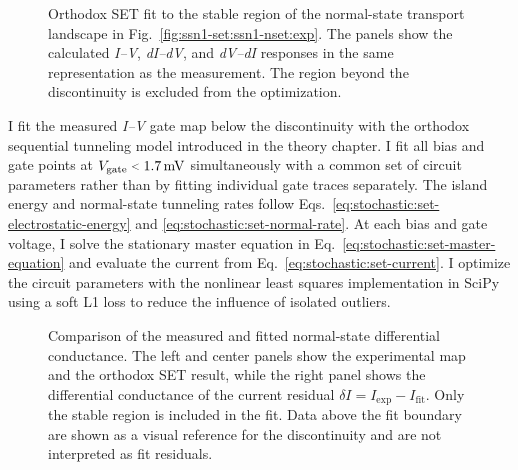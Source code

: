             \begin{figure}[p]
                \centering
                \caption{
                    Measured normal-state gate--bias transport of SET1 after opening the break junction. The panels show the \textit{I--V}, \textit{dI--dV}, and \textit{dV--dI} responses as selected traces, surfaces, and false-color maps. The periodic low conductance regions form Coulomb diamonds whose two edge families have different absolute slopes. The abrupt change during the gate sweep is consistent with an atomic rearrangement of the break junction.
                }
                \label{fig:ssn1-set:ssn1-nset:exp}

                \vspace{1em}

                \caption{
                    Orthodox SET fit to the stable region of the normal-state transport landscape in Fig.~\ref{fig:ssn1-set:ssn1-nset:exp}. The panels show the calculated \textit{I--V}, \textit{dI--dV}, and \textit{dV--dI} responses in the same representation as the measurement. The region beyond the discontinuity is excluded from the optimization.
                }
                \label{fig:ssn1-set:ssn1-nset:fit}
            \end{figure}

            I fit the measured \textit{I--V} gate map below the discontinuity with the orthodox sequential tunneling model introduced in the theory chapter. I fit all bias and gate points at $V_\mathrm{gate}\slt{}\qty{1.7}{\milli\volt}$ simultaneously with a common set of circuit parameters rather than by fitting individual gate traces separately. The island energy and normal-state tunneling rates follow Eqs.~\eqref{eq:stochastic:set-electrostatic-energy} and \eqref{eq:stochastic:set-normal-rate}. At each bias and gate voltage, I solve the stationary master equation in Eq.~\eqref{eq:stochastic:set-master-equation} and evaluate the current from Eq.~\eqref{eq:stochastic:set-current}. I optimize the circuit parameters with the nonlinear least squares implementation in SciPy using a soft L1 loss to reduce the influence of isolated outliers.

            \begin{figure}[t]
                \centering
                \caption{
                    Comparison of the measured and fitted normal-state differential conductance. The left and center panels show the experimental map and the orthodox SET result, while the right panel shows the differential conductance of the current residual $\delta I=I_\mathrm{exp}-I_\mathrm{fit}$. Only the stable region is included in the fit. Data above the fit boundary are shown as a visual reference for the discontinuity and are not interpreted as fit residuals.
                }
                \label{fig:ssn1-nset:dGdiff}
            \end{figure}

